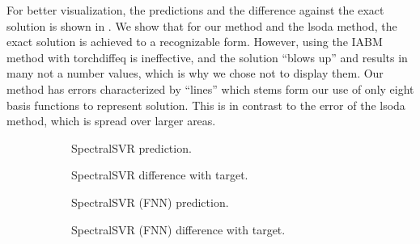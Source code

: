 \documentclass[preprint,12pt,times,authoryear]{elsarticle}
\begin{document}
For better visualization, the predictions and the difference against the exact solution is shown in . We show that for our method and the lsoda method, the exact solution is achieved to a recognizable form. However, using the IABM method with torchdiffeq is ineffective, and the solution \enquote{blows up} and results in many not a number values, which is why we chose not to display them. Our method has errors characterized by \enquote{lines} which stems form our use of only eight basis functions to represent solution. This is in contrast to the error of the lsoda method, which is spread over larger areas.
\begin{figure}[hbp]
  \centering
  \begin{adjustwidth}{-0.05\linewidth}{-0.05\linewidth}
    \begin{subfigure}{0.49\linewidth}
      \begin{adjustbox}{width=\linewidth}
        
      \end{adjustbox}
      \caption{SpectralSVR prediction.}\label{fig:comp_exact_lssvr_pred_0.1}
    \end{subfigure}
    \begin{subfigure}{0.49\linewidth}
      \begin{adjustbox}{width=\linewidth}
        
      \end{adjustbox}
      \caption{SpectralSVR difference with target.}\label{fig:comp_exact_lssvr_diff_0.1}
    \end{subfigure}
    \begin{subfigure}{0.49\linewidth}
      \begin{adjustbox}{width=\linewidth}
        
      \end{adjustbox}
      \caption{SpectralSVR (FNN) prediction.}\label{fig:comp_exact_fnn_pred_0.1}
    \end{subfigure}
    \begin{subfigure}{0.49\linewidth}
      \begin{adjustbox}{width=\linewidth}
        
      \end{adjustbox}
      \caption{SpectralSVR (FNN) difference with target.}\label{fig:comp_exact_fnn_diff_0.1}
    \end{subfigure}
    \begin{subfigure}{0.49\linewidth}

\end{subfigure}
\end{adjustwidth}
\end{figure}
\end{document}
